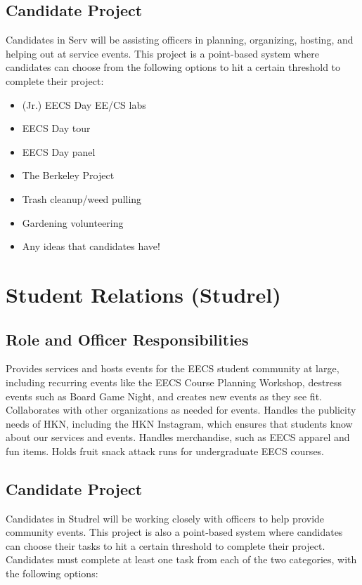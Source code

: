 \documentclass[11pt, article, oneside]{memoir}
\begin{document}
    \subsection{Candidate Project}
        Candidates in Serv will be assisting officers in planning, organizing, hosting, and helping out at service events.
        This project is a point-based system where candidates can choose from the following options to hit a certain threshold to complete their project:
        \begin{itemize}
            \item (Jr.) EECS Day EE/CS labs
            \item EECS Day tour
            \item EECS Day panel 
            \item The Berkeley Project 
            \item Trash cleanup/weed pulling
            \item Gardening volunteering
            \item Any ideas that candidates have!
        \end{itemize}

    \section{Student Relations (Studrel)}
    \subsection{Role and Officer Responsibilities}
        Provides services and hosts events for the EECS student community at large, including recurring events like the EECS Course Planning Workshop, destress events such as Board Game Night, and creates new events as they see fit.
        Collaborates with other organizations as needed for events.
        Handles the publicity needs of HKN, including the HKN Instagram, which ensures that students know about our services and events.
        Handles merchandise, such as EECS apparel and fun items.
        Holds fruit snack attack runs for undergraduate EECS courses.

    \subsection{Candidate Project}
        Candidates in Studrel will be working closely with officers to help provide community events.
        This project is also a point-based system where candidates can choose their tasks to hit a certain threshold to complete their project.
        Candidates must complete at least one task from each of the two categories, with the following options:
\end{document}
